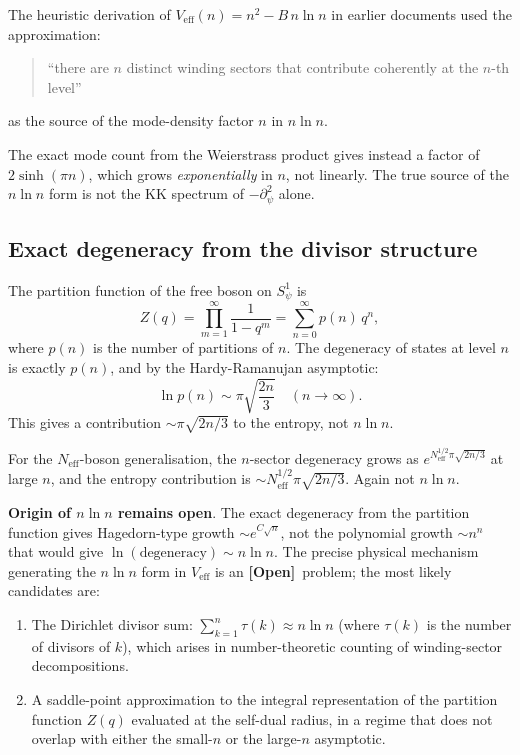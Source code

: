 \documentclass[12pt,a4paper]{article}
\theoremstyle{definition}
\theoremstyle{remark}
\newcommand{\OPEN}{\textbf{[Open]}}
\begin{document}
The heuristic derivation of $V_{\mathrm{eff}}(n) = n^2 - B\,n\ln n$ in earlier
documents used the approximation:
\begin{quote}
``there are $n$ distinct winding sectors that contribute coherently at the
$n$-th level''
\end{quote}
as the source of the mode-density factor $n$ in $n\ln n$.

The exact mode count from the Weierstrass product gives instead a factor of
$2\sinh(\pi n)$, which grows \emph{exponentially} in $n$, not linearly.  The
true source of the $n\ln n$ form is not the KK spectrum of $-\partial^2_\psi$
alone.

\subsection{Exact degeneracy from the divisor structure}

The partition function of the free boson on $S^1_\psi$ is
\begin{equation}
  Z(q) = \prod_{m=1}^\infty \frac{1}{1-q^m}
  = \sum_{n=0}^\infty p(n)\,q^n,
  \label{eq:cw:Zboson}
\end{equation}
where $p(n)$ is the number of partitions of $n$.  The degeneracy of states
at level $n$ is exactly $p(n)$, and by the Hardy-Ramanujan asymptotic:
\begin{equation}
  \ln p(n) \sim \pi\sqrt{\frac{2n}{3}} \quad (n \to \infty).
  \label{eq:cw:HR}
\end{equation}
This gives a contribution $\sim \pi\sqrt{2n/3}$ to the entropy, not $n\ln n$.

For the $N_{\mathrm{eff}}$-boson generalisation, the $n$-sector degeneracy grows as
$e^{N_{\mathrm{eff}}^{1/2}\pi\sqrt{2n/3}}$ at large $n$, and the entropy contribution
is $\sim N_{\mathrm{eff}}^{1/2} \pi \sqrt{2n/3}$.  Again not $n\ln n$.

\begin{gapbox}
\textbf{Origin of $n\ln n$ remains open}.  The exact degeneracy from the
partition function gives Hagedorn-type growth $\sim e^{C\sqrt{n}}$, not
the polynomial growth $\sim n^n$ that would give $\ln(\text{degeneracy})
\sim n\ln n$.  The precise physical mechanism generating the $n\ln n$ form
in $V_{\mathrm{eff}}$ is an \OPEN\ problem; the most likely candidates are:
\begin{enumerate}
  \item The Dirichlet divisor sum: $\sum_{k=1}^n \tau(k) \approx n\ln n$
        (where $\tau(k)$ is the number of divisors of $k$), which arises
        in number-theoretic counting of winding-sector decompositions.
  \item A saddle-point approximation to the integral representation of
        the partition function $Z(q)$ evaluated at the self-dual radius,
        in a regime that does not overlap with either the small-$n$ or
        the large-$n$ asymptotic.
\end{enumerate}
\end{gapbox}
\end{document}
